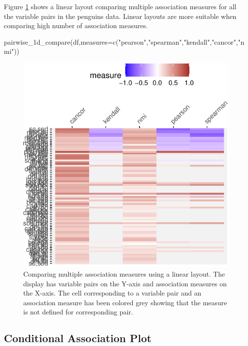 Figure \ref{fig:compare-linear} shows a linear layout comparing multiple
association measures for all the variable pairs in the penguins data.
Linear layouts are more suitable when comparing high number of
association measures.

\begin{Schunk}
\begin{Sinput}
pairwise_1d_compare(df,measures=c("pearson","spearman","kendall","cancor","nmi"))
\end{Sinput}
\begin{figure}

{\centering \includegraphics{rj_paper_files/figure-latex/compare-linear-1} 

}

\caption[Comparing multiple association measures using a linear layout]{Comparing multiple association measures using a linear layout. The display has variable pairs on the Y-axis and association measures on the X-axis. The cell corresponding to a variable pair and an association measure has been colored grey showing that the measure is not defined for corresponding pair.}\label{fig:compare-linear}
\end{figure}
\end{Schunk}

\hypertarget{conditional-association-plot}{%
\subsection{Conditional Association
Plot}\label{conditional-association-plot}}

